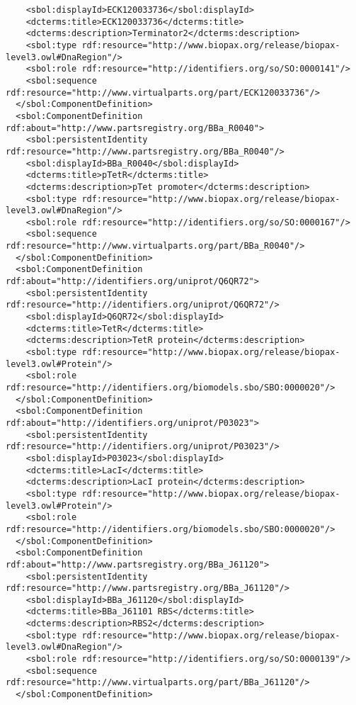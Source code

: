 \begin{lstlisting}
    <sbol:displayId>ECK120033736</sbol:displayId>
    <dcterms:title>ECK120033736</dcterms:title>
    <dcterms:description>Terminator2</dcterms:description>
    <sbol:type rdf:resource="http://www.biopax.org/release/biopax-level3.owl#DnaRegion"/>
    <sbol:role rdf:resource="http://identifiers.org/so/SO:0000141"/>
    <sbol:sequence rdf:resource="http://www.virtualparts.org/part/ECK120033736"/>
  </sbol:ComponentDefinition>
  <sbol:ComponentDefinition rdf:about="http://www.partsregistry.org/BBa_R0040">
    <sbol:persistentIdentity rdf:resource="http://www.partsregistry.org/BBa_R0040"/>
    <sbol:displayId>BBa_R0040</sbol:displayId>
    <dcterms:title>pTetR</dcterms:title>
    <dcterms:description>pTet promoter</dcterms:description>
    <sbol:type rdf:resource="http://www.biopax.org/release/biopax-level3.owl#DnaRegion"/>
    <sbol:role rdf:resource="http://identifiers.org/so/SO:0000167"/>
    <sbol:sequence rdf:resource="http://www.virtualparts.org/part/BBa_R0040"/>
  </sbol:ComponentDefinition>
  <sbol:ComponentDefinition rdf:about="http://identifiers.org/uniprot/Q6QR72">
    <sbol:persistentIdentity rdf:resource="http://identifiers.org/uniprot/Q6QR72"/>
    <sbol:displayId>Q6QR72</sbol:displayId>
    <dcterms:title>TetR</dcterms:title>
    <dcterms:description>TetR protein</dcterms:description>
    <sbol:type rdf:resource="http://www.biopax.org/release/biopax-level3.owl#Protein"/>
    <sbol:role rdf:resource="http://identifiers.org/biomodels.sbo/SBO:0000020"/>
  </sbol:ComponentDefinition>
  <sbol:ComponentDefinition rdf:about="http://identifiers.org/uniprot/P03023">
    <sbol:persistentIdentity rdf:resource="http://identifiers.org/uniprot/P03023"/>
    <sbol:displayId>P03023</sbol:displayId>
    <dcterms:title>LacI</dcterms:title>
    <dcterms:description>LacI protein</dcterms:description>
    <sbol:type rdf:resource="http://www.biopax.org/release/biopax-level3.owl#Protein"/>
    <sbol:role rdf:resource="http://identifiers.org/biomodels.sbo/SBO:0000020"/>
  </sbol:ComponentDefinition>
  <sbol:ComponentDefinition rdf:about="http://www.partsregistry.org/BBa_J61120">
    <sbol:persistentIdentity rdf:resource="http://www.partsregistry.org/BBa_J61120"/>
    <sbol:displayId>BBa_J61120</sbol:displayId>
    <dcterms:title>BBa_J61101 RBS</dcterms:title>
    <dcterms:description>RBS2</dcterms:description>
    <sbol:type rdf:resource="http://www.biopax.org/release/biopax-level3.owl#DnaRegion"/>
    <sbol:role rdf:resource="http://identifiers.org/so/SO:0000139"/>
    <sbol:sequence rdf:resource="http://www.virtualparts.org/part/BBa_J61120"/>
  </sbol:ComponentDefinition>

\end{lstlisting}
